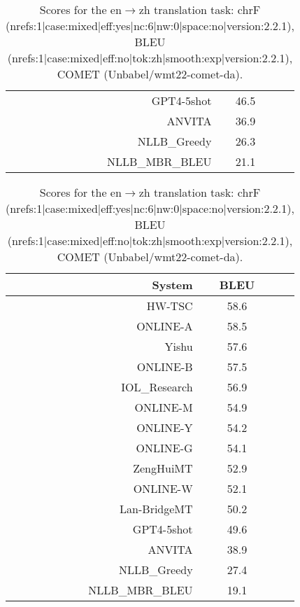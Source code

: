 \documentclass[11pt]{article}
\begin{document}
\begin{table}
\begin{subtable}[t]{0.33\textwidth}
\begin{tabular}{rcc}
\rowcolor{ashgrey} GPT4-5shot  & 46.5 \\ 
ANVITA & 36.9 \\ 
\rowcolor{ashgrey} NLLB\_Greedy  & 26.3 \\ 
\rowcolor{ashgrey} NLLB\_MBR\_BLEU  & 21.1 \\ 
\bottomrule 
\end{tabular} 
\end{subtable} 
\begin{subtable}[t]{0.33\textwidth}
\begin{tabular}{rcc}
\toprule 
System  & BLEU \\ 
\midrule 
HW-TSC  & 58.6 \\ 
\rowcolor{ashgrey} ONLINE-A & 58.5 \\ 
\rowcolor{ashgrey} Yishu  & 57.6 \\ 
\rowcolor{ashgrey} ONLINE-B  & 57.5 \\ 
IOL\_Research  & 56.9 \\ 
\rowcolor{ashgrey} ONLINE-M & 54.9 \\ 
\rowcolor{ashgrey} ONLINE-Y  & 54.2 \\ 
\rowcolor{ashgrey} ONLINE-G  & 54.1 \\ 
\rowcolor{ashgrey} ZengHuiMT  & 52.9 \\ 
\rowcolor{ashgrey} ONLINE-W  & 52.1 \\ 
\rowcolor{ashgrey} Lan-BridgeMT  & 50.2 \\ 
\rowcolor{ashgrey} GPT4-5shot  & 49.6 \\ 
ANVITA  & 38.9 \\ 
\rowcolor{ashgrey} NLLB\_Greedy  & 27.4 \\ 
\rowcolor{ashgrey} NLLB\_MBR\_BLEU  & 19.1 \\ 
\bottomrule 
\end{tabular} 
\end{subtable}  
\caption{Scores for the en$\rightarrow$zh translation task: chrF (nrefs:1|case:mixed|eff:yes|nc:6|nw:0|space:no|version:2.2.1), BLEU (nrefs:1|case:mixed|eff:no|tok:zh|smooth:exp|version:2.2.1), COMET (Unbabel/wmt22-comet-da).} 
\end{table}



\clearpage
\end{document}
